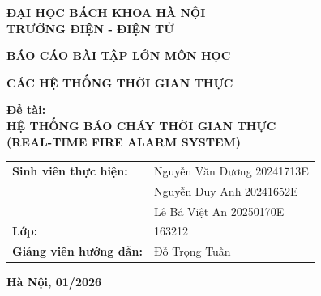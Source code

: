 \documentclass[12pt,a4paper]{report}
\begin{document}
\begin{titlepage}
    \begin{center}
        \textbf{\large ĐẠI HỌC BÁCH KHOA HÀ NỘI}\\
        \textbf{\large TRƯỜNG ĐIỆN - ĐIỆN TỬ}
        
        \vfill 
        
        {\bfseries \Huge BÁO CÁO BÀI TẬP LỚN MÔN HỌC \par}
        \vspace{0.5cm}
        {\bfseries \Large CÁC HỆ THỐNG THỜI GIAN THỰC \par}
        
        \vspace{1.5cm} 
        
        {\bfseries \Large Đề tài: \\ HỆ THỐNG BÁO CHÁY THỜI GIAN THỰC \\ (REAL-TIME FIRE ALARM SYSTEM) \par}
        
        \vfill 
        
        \begin{tabular}{ll} 
            \textbf{Sinh viên thực hiện:} & Nguyễn Văn Dương 20241713E\\
                                          &Nguyễn Duy Anh 20241652E\\
                                          &Lê Bá Việt An 20250170E\\
            \textbf{Lớp:}                 &163212 \\
            \textbf{Giảng viên hướng dẫn:}&Đỗ Trọng Tuấn \\
        \end{tabular}

        \vfill 
        
        \textbf{Hà Nội, 01/2026}
    \end{center}
\end{titlepage}

\tableofcontents
\newpage

\end{document}
